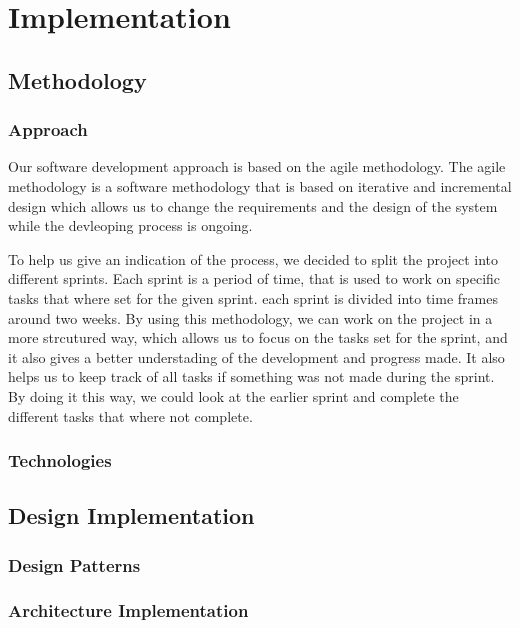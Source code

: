 \section{Implementation}

\subsection{Methodology}

\subsubsection{Approach}
Our software development approach is based on the agile methodology. The agile methodology is a software methodology that is based on iterative and incremental design
which allows us to change the requirements and the design of the system while the devleoping process is ongoing. \newline

To help us give an indication of the process, we decided to split the project into different sprints. Each sprint is a period of time, that is used to work on specific tasks that where set for the given sprint.
each sprint is divided into time frames around two weeks. By using this methodology, we can work on the project in a more strcutured way, which allows us to focus on the tasks set for the sprint,
and it also gives a better understading of the development and progress made. It also helps us to keep track of all tasks if something was not made during the sprint. By doing it this way, we could look at the earlier sprint and complete the different tasks that where not complete. \newline
\subsubsection{Technologies}

\subsection{Design Implementation}
\subsubsection{Design Patterns}
\subsubsection{Architecture Implementation}

